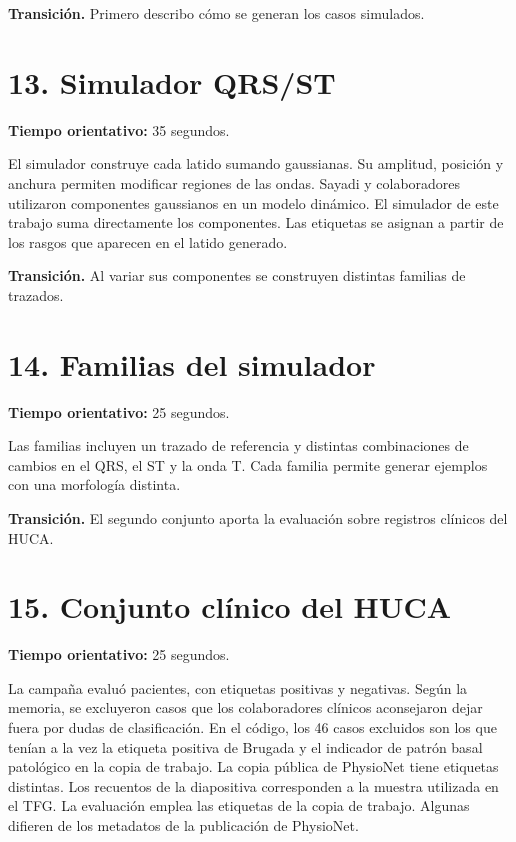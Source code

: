 \documentclass[11pt,a4paper]{article}
\begin{document}
\textbf{Transición.} Primero describo cómo se generan los casos simulados.

\section*{13. Simulador QRS/ST}
\textbf{Tiempo orientativo: }35 segundos.

El simulador construye cada latido sumando gaussianas. Su amplitud, posición y anchura permiten modificar regiones de las ondas. Sayadi y colaboradores utilizaron componentes gaussianos en un modelo dinámico. El simulador de este trabajo suma directamente los componentes. Las etiquetas se asignan a partir de los rasgos que aparecen en el latido generado.

\textbf{Transición.} Al variar sus componentes se construyen distintas familias de trazados.

\section*{14. Familias del simulador}
\textbf{Tiempo orientativo: }25 segundos.

Las familias incluyen un trazado de referencia y distintas combinaciones de cambios en el QRS, el ST y la onda T. Cada familia permite generar ejemplos con una morfología distinta.

\textbf{Transición.} El segundo conjunto aporta la evaluación sobre registros clínicos del HUCA.

\section*{15. Conjunto clínico del HUCA}
\textbf{Tiempo orientativo: }25 segundos.

La campaña evaluó \HucaPatients{} pacientes, con \HucaPositive{} etiquetas positivas y \HucaNegative{} negativas. Según la memoria, se excluyeron casos que los colaboradores clínicos aconsejaron dejar fuera por dudas de clasificación. En el código, los 46 casos excluidos son los que tenían a la vez la etiqueta positiva de Brugada y el indicador de patrón basal patológico en la copia de trabajo. La copia pública de PhysioNet tiene etiquetas distintas. Los recuentos de la diapositiva corresponden a la muestra utilizada en el TFG. La evaluación emplea las etiquetas de la copia de trabajo. Algunas difieren de los metadatos de la publicación de PhysioNet.
\end{document}
